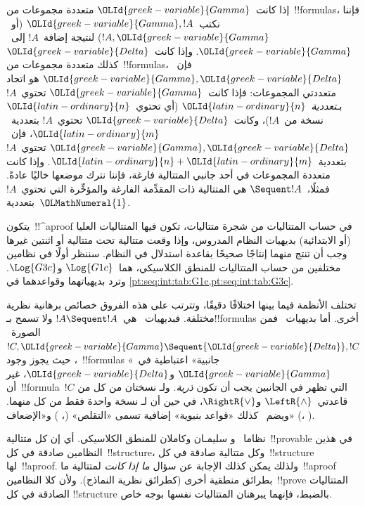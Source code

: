 \documentclass[../../../include/open-logic-section]{subfiles}
\begin{document}
إذا كانت~${\OLId{greek-variable}{Gamma}}$ متعددة مجموعات من~!!{formula}s، فإننا نكتب~${\OLId{greek-variable}{Gamma}},!A$
(أو~$!A,{\OLId{greek-variable}{Gamma}}$) لنتيجة إضافة~$!A$ إلى~${\OLId{greek-variable}{Gamma}}$. وإذا كانت~${\OLId{greek-variable}{Delta}}$ كذلك
متعددة مجموعات من~!!{formula}s، فإن~${\OLId{greek-variable}{Gamma}},{\OLId{greek-variable}{Delta}}$ هو اتحاد متعددتي
المجموعات: فإذا كانت~${\OLId{greek-variable}{Gamma}}$ تحتوي~$!A$ بـ\emph{تعددية}~${\OLId{latin-ordinary}{n}}$ (أي تحتوي~${\OLId{latin-ordinary}{n}}$ نسخة
من~$!A$)، وكانت~${\OLId{greek-variable}{Delta}}$ تحتوي~$!A$ بتعددية~${\OLId{latin-ordinary}{m}}$، فإن~${\OLId{greek-variable}{Gamma}},{\OLId{greek-variable}{Delta}}$
تحتوي~$!A$ بتعددية~${\OLId{latin-ordinary}{n}}+{\OLId{latin-ordinary}{m}}$. وإذا كانت متعددة المجموعات في أحد جانبي
المتتالية فارغة، فإننا نترك موضعها خاليًا عادةً. فمثلًا،~$\Sequent !A$
هي المتتالية ذات المقدِّمة الفارغة والمؤخِّرة التي تحتوي~$!A$ بتعددية~${\OLMathNumeral{1}}$.

يتكون~!!^a{proof} في حساب المتتاليات من شجرة متتاليات، تكون فيها
المتتاليات العليا (أو الابتدائية) بديهيات النظام المدروس، وإذا وقعت متتالية
تحت متتالية أو اثنتين غيرها وجب أن تنتج منهما إنتاجًا صحيحًا بقاعدة
استدلال في النظام. سننظر أولًا في نظامين مختلفين من حساب المتتاليات للمنطق
الكلاسيكي، هما~$\Log{G1c}$ و$\Log{G3c}$. وترد بديهياتهما وقواعدهما في
\cref{pt:seq:int:tab:G1c,pt:seq:int:tab:G3c}. 




تختلف الأنظمة فيما بينها اختلافًا دقيقًا، وتترتب على هذه الفروق خصائص
برهانية نظرية مختلفة. فبديهيات~ هي~$!A\Sequent !A$ ولا تسمح
بـ!!{formula}s أخرى. أما بديهيات~ فمن الصورة~$!C,{\OLId{greek-variable}{Gamma}}\Sequent
{\OLId{greek-variable}{Delta}},!C$، حيث يجوز وجود~!!{formula}s «جانبية» اعتباطية في~${\OLId{greek-variable}{Gamma}}$
و${\OLId{greek-variable}{Delta}}$، غير أن~!!{formula}~$!C$ التي تظهر في الجانبين يجب أن تكون
\emph{ذرية}. ولـ نسختان من كل من قاعدتي~$\LeftR{\land}$
و$\RightR{\lor}$، في حين أن لـ نسخة واحدة فقط من كل منهما.
ويضم~ كذلك «قواعد بنيوية» إضافية تسمى «التقلص»
(\LeftR{\Contraction}، \RightR{\Contraction}) و«الإضعاف»
(\LeftR{\Weakening}، \RightR{\Weakening}).

نظاما~ و سليمـان وكاملان للمنطق الكلاسيكي. أي إن كل
متتالية~!!{provable} في هذين النظامين صادقة في كل~!!{structure}، وكل
متتالية صادقة في كل~!!{structure} لها~!!a{proof}. ولذلك يمكن كذلك الإجابة
عن سؤال \emph{ما إذا كانت} لمتتالية ما~!!a{proof} بطرائق منطقية أخرى (كطرائق
نظرية النماذج). ولأن كلا النظامين~!!{prove} المتتاليات الصادقة في كل
!!{structure} بالضبط، فإنهما يبرهنان المتتاليات نفسها بوجه خاص.
\end{document}
